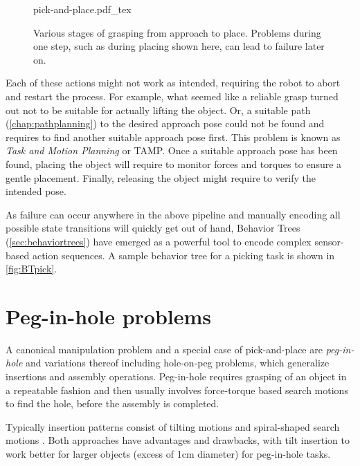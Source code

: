 \begin{figure}
    \def\svgwidth{\textwidth}
    {pick-and-place.pdf_tex}
    \caption{Various stages of grasping from approach to place. Problems during one step, such as during placing shown here, can lead to failure later on.\label{fig:pick-and-place}}
\end{figure}

Each of these actions might not work as intended, requiring the robot to abort and restart the process. For example, what seemed like a reliable grasp turned out not to be suitable for actually lifting the object. Or, a suitable path (\cref{chap:pathplanning}) to the desired approach pose could not be found and requires to find another suitable approach pose first. This problem is known as \emph{Task and Motion Planning} or TAMP. Once a suitable approach pose has been found, placing the object will require to monitor forces and torques to ensure a gentle placement. Finally, releasing the object might require to verify the intended pose. 

As failure can occur anywhere in the above pipeline and manually encoding all possible state transitions will quickly get out of hand,  Behavior Trees (\cref{sec:behaviortrees}) have emerged as a powerful tool to encode complex sensor-based action sequences. A sample behavior tree for a picking task is shown in \cref{fig:BTpick}.

\section{Peg-in-hole problems}\label{sec:peginhole}
A canonical manipulation problem and a special case of pick-and-place are \textsl{peg-in-hole} and variations thereof including hole-on-peg problems, which generalize insertions and assembly operations. Peg-in-hole requires grasping of an object in a repeatable fashion and then usually involves force-torque based search motions to find the hole, before the assembly is completed. 

Typically insertion patterns consist of tilting motions and spiral-shaped search motions \cite{watson2020autonomous}. Both approaches have advantages and drawbacks, with tilt insertion to work better for larger objects (excess of 1cm diameter) for peg-in-hole tasks. 

